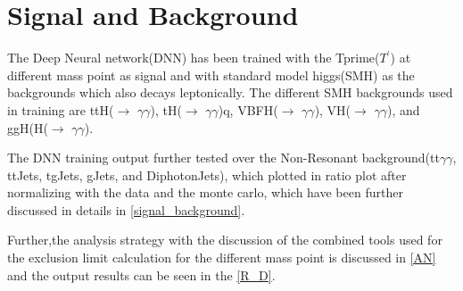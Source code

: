 \section{Signal and Background}
The Deep Neural network(DNN) has been trained with the Tprime($T^'$) at different mass point as signal and with standard model higgs(SMH) as the backgrounds which also decays leptonically. The different SMH backgrounds used in training are ttH($\longrightarrow$ $\gamma \gamma$), tH($\longrightarrow$ $\gamma \gamma$)q, VBFH($\longrightarrow$ $\gamma \gamma$), VH($\longrightarrow$ $\gamma \gamma$), and ggH(H($\longrightarrow$ $\gamma \gamma$).

The DNN training output further tested over the Non-Resonant background(tt$\gamma \gamma$, ttJets, tgJets, gJets, and DiphotonJets), which plotted in ratio plot after normalizing with the data and the monte carlo, which have been further discussed in details in \autoref{signal_background}. 


Further,the analysis strategy with the discussion of the combined tools used for the exclusion limit calculation for the different mass point is discussed in \autoref{AN} and the output results can be seen in the \autoref{R_D}.















    









